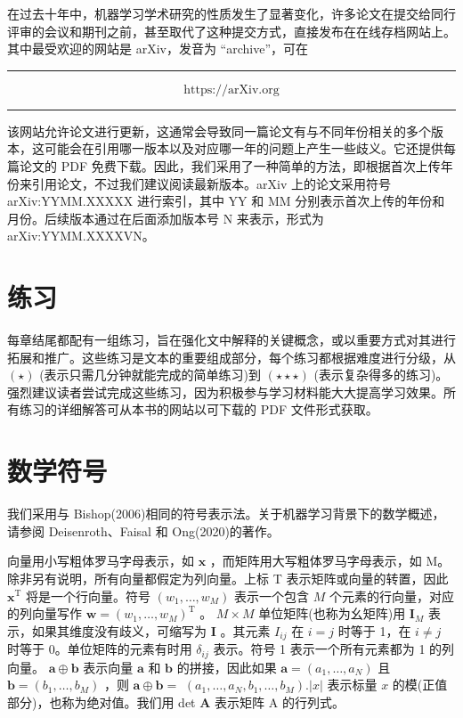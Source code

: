 \documentclass[10pt]{article}
\newcommand{\HRule}{\begin{center}\rule{0.9\linewidth}{0.2mm}\end{center}}
\begin{document}
在过去十年中，机器学习学术研究的性质发生了显著变化，许多论文在提交给同行评审的会议和期刊之前，甚至取代了这种提交方式，直接发布在在线存档网站上。其中最受欢迎的网站是 arXiv，发音为 “archive”，可在

\HRule

\[
\text{ https://arXiv.org }
\]

\HRule

该网站允许论文进行更新，这通常会导致同一篇论文有与不同年份相关的多个版本，这可能会在引用哪一版本以及对应哪一年的问题上产生一些歧义。它还提供每篇论文的 PDF 免费下载。因此，我们采用了一种简单的方法，即根据首次上传年份来引用论文，不过我们建议阅读最新版本。arXiv 上的论文采用符号 arXiv:YYMM.XXXXX 进行索引，其中 YY 和 MM 分别表示首次上传的年份和月份。后续版本通过在后面添加版本号 \(\mathrm{N}\) 来表示，形式为 arXiv:YYMM.XXXXVN。

\section*{练习}

每章结尾都配有一组练习，旨在强化文中解释的关键概念，或以重要方式对其进行拓展和推广。这些练习是文本的重要组成部分，每个练习都根据难度进行分级，从 \(\left( \star \right)\) (表示只需几分钟就能完成的简单练习)到 \(\left( {\star  \star   \star  }\right)\) (表示复杂得多的练习)。强烈建议读者尝试完成这些练习，因为积极参与学习材料能大大提高学习效果。所有练习的详细解答可从本书的网站以可下载的 PDF 文件形式获取。

\section*{数学符号}

我们采用与 Bishop(2006)相同的符号表示法。关于机器学习背景下的数学概述，请参阅 Deisenroth、Faisal 和 Ong(2020)的著作。

向量用小写粗体罗马字母表示，如 \(\mathbf{x}\) ，而矩阵用大写粗体罗马字母表示，如 M。除非另有说明，所有向量都假定为列向量。上标 T 表示矩阵或向量的转置，因此 \({\mathbf{x}}^{\mathrm{T}}\) 将是一个行向量。符号 \(\left( {{w}_{1},\ldots ,{w}_{M}}\right)\) 表示一个包含 \(M\) 个元素的行向量，对应的列向量写作 \(\mathbf{w} = {\left( {w}_{1},\ldots ,{w}_{M}\right) }^{\mathrm{T}}\) 。 \(M \times  M\) 单位矩阵(也称为幺矩阵)用 \({\mathbf{I}}_{M}\) 表示，如果其维度没有歧义，可缩写为 \(\mathbf{I}\) 。其元素 \({I}_{ij}\) 在 \(i = j\) 时等于 1，在 \(i \neq  j\) 时等于 0。单位矩阵的元素有时用 \({\delta }_{ij}\) 表示。符号 1 表示一个所有元素都为 1 的列向量。 \(\mathbf{a} \oplus  \mathbf{b}\) 表示向量 \(\mathbf{a}\) 和 \(\mathbf{b}\) 的拼接，因此如果 \(\mathbf{a} = \left( {{a}_{1},\ldots ,{a}_{N}}\right)\) 且 \(\mathbf{b} = \left( {{b}_{1},\ldots ,{b}_{M}}\right)\) ，则 \(\mathbf{a} \oplus  \mathbf{b} =\)  \(\left( {{a}_{1},\ldots ,{a}_{N},{b}_{1},\ldots ,{b}_{M}}\right) .\left| x\right|\) 表示标量 \(x\) 的模(正值部分)，也称为绝对值。我们用 det \(\mathbf{A}\) 表示矩阵 A 的行列式。
\end{document}
